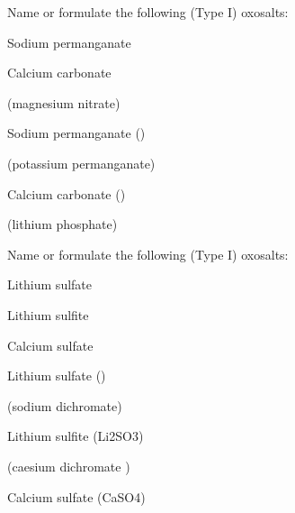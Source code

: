 \documentclass[main.tex]{subfiles}
\begin{document}
\begin{multicols*}{2}
\begin{question}[ID=\the\value{numA}]
Name or formulate the following (Type I) oxosalts:
\begin{inparaenum}[(a)]
\item {}			%
\item Sodium permanganate 	%
\item {}			%
\item Calcium carbonate		%
\item {}			%
\end{inparaenum}
\end{question}
\begin{solution}
\begin{inparaenum}[(a)]
\item {}			 (magnesium nitrate) 	
\item Sodium permanganate 	 ()
\item {}			 (potassium permanganate)
\item Calcium carbonate		 ()
\item {}			 (lithium phosphate)
 \end{inparaenum}\hspace{0.1cm}\end{solution}
\begin{question}[ID=\the\value{numA}]
Name or formulate the following (Type I) oxosalts:
\begin{inparaenum}[(a)]
\item Lithium sulfate			%
\item {} 			%
\item Lithium sulfite			%
\item {}			%
\item Calcium sulfate			%
\end{inparaenum}
\end{question}
\begin{solution}
\begin{inparaenum}[(a)]
\item Lithium sulfate			 ()	
\item {} 			 (sodium dichromate)
\item Lithium sulfite			 (Li2SO3)
\item {}			 (caesium dichromate )
\item Calcium sulfate			(CaSO4)
 \end{inparaenum}\hspace{0.1cm}\end{solution}
	 	

\end{multicols*}
\end{document}

